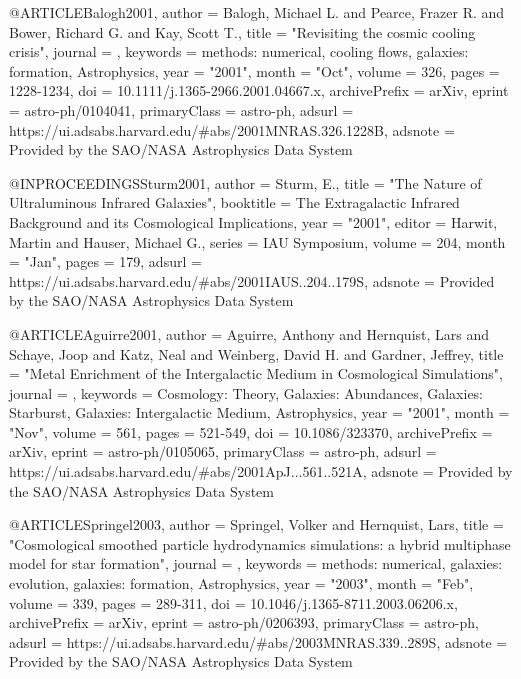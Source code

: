 {@ARTICLE{Balogh2001,
       author = {{Balogh}, Michael L. and {Pearce}, Frazer R. and {Bower}, Richard G. and
         {Kay}, Scott T.},
        title = "{Revisiting the cosmic cooling crisis}",
      journal = {\mnras},
     keywords = {methods: numerical, cooling flows, galaxies: formation, Astrophysics},
         year = "2001",
        month = "Oct",
       volume = {326},
        pages = {1228-1234},
          doi = {10.1111/j.1365-2966.2001.04667.x},
archivePrefix = {arXiv},
       eprint = {astro-ph/0104041},
 primaryClass = {astro-ph},
       adsurl = {https://ui.adsabs.harvard.edu/\#abs/2001MNRAS.326.1228B},
      adsnote = {Provided by the SAO/NASA Astrophysics Data System}
}

@INPROCEEDINGS{Sturm2001,
       author = {{Sturm}, E.},
        title = "{The Nature of Ultraluminous Infrared Galaxies}",
    booktitle = {The Extragalactic Infrared Background and its Cosmological Implications},
         year = "2001",
       editor = {{Harwit}, Martin and {Hauser}, Michael G.},
       series = {IAU Symposium},
       volume = {204},
        month = "Jan",
        pages = {179},
       adsurl = {https://ui.adsabs.harvard.edu/\#abs/2001IAUS..204..179S},
      adsnote = {Provided by the SAO/NASA Astrophysics Data System}
}

@ARTICLE{Aguirre2001,
       author = {{Aguirre}, Anthony and {Hernquist}, Lars and {Schaye}, Joop and
         {Katz}, Neal and {Weinberg}, David H. and {Gardner}, Jeffrey},
        title = "{Metal Enrichment of the Intergalactic Medium in Cosmological Simulations}",
      journal = {\apj},
     keywords = {Cosmology: Theory, Galaxies: Abundances, Galaxies: Starburst, Galaxies: Intergalactic Medium, Astrophysics},
         year = "2001",
        month = "Nov",
       volume = {561},
        pages = {521-549},
          doi = {10.1086/323370},
archivePrefix = {arXiv},
       eprint = {astro-ph/0105065},
 primaryClass = {astro-ph},
       adsurl = {https://ui.adsabs.harvard.edu/\#abs/2001ApJ...561..521A},
      adsnote = {Provided by the SAO/NASA Astrophysics Data System}
}

@ARTICLE{Springel2003,
       author = {{Springel}, Volker and {Hernquist}, Lars},
        title = "{Cosmological smoothed particle hydrodynamics simulations: a hybrid multiphase model for star formation}",
      journal = {\mnras},
     keywords = {methods: numerical, galaxies: evolution, galaxies: formation, Astrophysics},
         year = "2003",
        month = "Feb",
       volume = {339},
        pages = {289-311},
          doi = {10.1046/j.1365-8711.2003.06206.x},
archivePrefix = {arXiv},
       eprint = {astro-ph/0206393},
 primaryClass = {astro-ph},
       adsurl = {https://ui.adsabs.harvard.edu/\#abs/2003MNRAS.339..289S},
      adsnote = {Provided by the SAO/NASA Astrophysics Data System}
}

}
